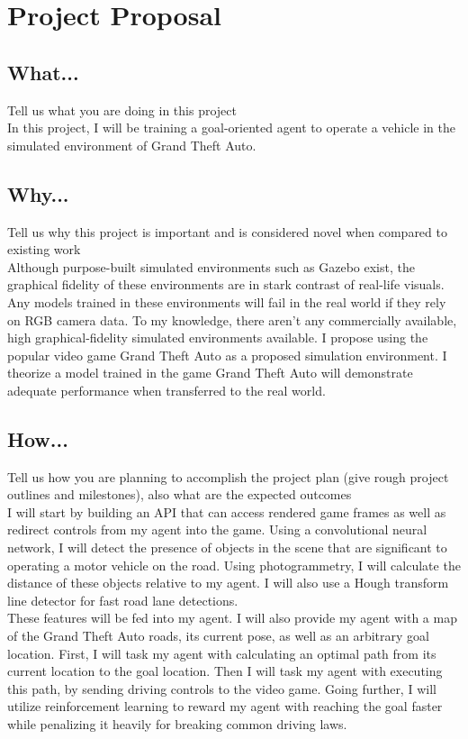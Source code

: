 \section*{Project Proposal}

\subsection{What...}
Tell us what you are doing in this project\\
In this project, I will be training a goal-oriented agent to operate a vehicle in the simulated environment of Grand Theft Auto.
\subsection{Why...}
Tell us why this project is important and is considered novel when compared to existing work\\
Although purpose-built simulated environments such as Gazebo exist, the graphical fidelity of these environments are in stark contrast of real-life visuals. Any models trained in these environments will fail in the real world if they rely on RGB camera data. To my knowledge, there aren't any commercially available, high graphical-fidelity simulated environments available. I propose using the popular video game Grand Theft Auto as a proposed simulation environment. I theorize a model trained in the game Grand Theft Auto will demonstrate adequate performance when transferred to the real world.
\subsection{How...}
Tell us how you are planning to accomplish the project plan (give rough project outlines and milestones), also what are the expected outcomes\\
I will start by building an API that can access rendered game frames as well as redirect controls from my agent into the game. Using a convolutional neural network, I will detect the presence of objects in the scene that are significant to operating a motor vehicle on the road. Using photogrammetry, I will calculate the distance of these objects relative to my agent. I will also use a Hough transform line detector for fast road lane detections.\\
These features will be fed into my agent. I will also provide my agent with a map of the Grand Theft Auto roads, its current pose, as well as an arbitrary goal location. First, I will task my agent with calculating an optimal path from its current location to the goal location. Then I will task my agent with executing this path, by sending driving controls to the video game. Going further, I will utilize reinforcement learning to reward my agent with reaching the goal faster while penalizing it heavily for breaking common driving laws. 

